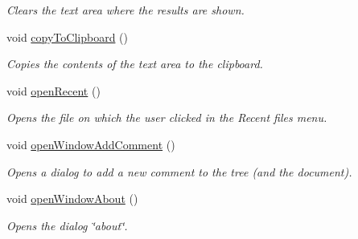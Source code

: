 \begin{DoxyCompactItemize}
\begin{DoxyCompactList}\small\item\em Clears the text area where the results are shown. \end{DoxyCompactList}\item 
\hypertarget{classMainWindow_a3867c6fa0d0e97c5a9dcc7dd67ce528f}{void \hyperlink{classMainWindow_a3867c6fa0d0e97c5a9dcc7dd67ce528f}{copy\-To\-Clipboard} ()}\label{classMainWindow_a3867c6fa0d0e97c5a9dcc7dd67ce528f}

\begin{DoxyCompactList}\small\item\em Copies the contents of the text area to the clipboard. \end{DoxyCompactList}\item 
\hypertarget{classMainWindow_acb446340737c00f7970ee3cf56982679}{void \hyperlink{classMainWindow_acb446340737c00f7970ee3cf56982679}{open\-Recent} ()}\label{classMainWindow_acb446340737c00f7970ee3cf56982679}

\begin{DoxyCompactList}\small\item\em Opens the file on which the user clicked in the Recent files menu. \end{DoxyCompactList}\item 
\hypertarget{classMainWindow_a71a0deb7cce3c55d9bec6c1ce69c79b3}{void \hyperlink{classMainWindow_a71a0deb7cce3c55d9bec6c1ce69c79b3}{open\-Window\-Add\-Comment} ()}\label{classMainWindow_a71a0deb7cce3c55d9bec6c1ce69c79b3}

\begin{DoxyCompactList}\small\item\em Opens a dialog to add a new comment to the tree (and the document). \end{DoxyCompactList}\item 
\hypertarget{classMainWindow_a5636c1b5036dd958fc79e6507fc230f5}{void \hyperlink{classMainWindow_a5636c1b5036dd958fc79e6507fc230f5}{open\-Window\-About} ()}\label{classMainWindow_a5636c1b5036dd958fc79e6507fc230f5}

\begin{DoxyCompactList}\small\item\em Opens the dialog \char`\"{}about\char`\"{}. \end{DoxyCompactList}\end{DoxyCompactItemize}

